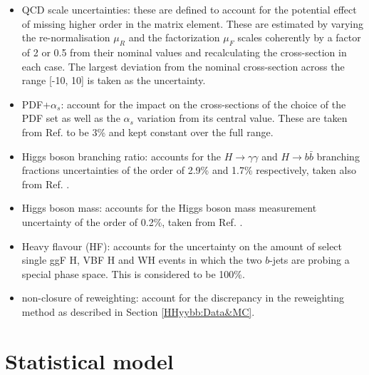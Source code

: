 \begin{itemize}
    \item QCD scale uncertainties: these are defined to account for the potential effect of missing higher order in the matrix element. These are estimated by varying the re-normalisation $\mu_R$ and the factorization $\mu_F$ scales coherently by a factor of 2 or 0.5 from their nominal values and recalculating the cross-section in each case. The largest deviation from the nominal cross-section across the \kl range [-10, 10] is taken as the uncertainty.  
    \item PDF+$\alpha_s$: account for the impact on the cross-sections of the choice of the PDF set as well as the $\alpha_{s}$ variation from its central value. These are taken from Ref. \cite{CERN_yellow} to be 3\% and kept constant over the full \kl range.
    \item Higgs boson branching ratio: accounts for the $H\to\gamma\gamma$ and $H\to b\bar{b}$ branching fractions uncertainties of the order of 2.9\% and 1.7\% respectively, taken also from Ref. \cite{CERN_yellow}. 
    \item Higgs boson mass: accounts for the Higgs boson mass measurement uncertainty of the order of 0.2\%, taken from Ref. \cite{Mass}. 
    \item Heavy flavour (HF): accounts for the uncertainty on the amount of select single ggF H, VBF H and WH events in which the two $b$-jets are probing a special phase space. This is considered to be 100\%.
    \item non-closure of \kl reweighting: account for the discrepancy in the \kl reweighting method as described in Section \ref{HHyybb:Data&MC}. 
\end{itemize}

\section{Statistical model}
\label{HHyybb:Stat}

